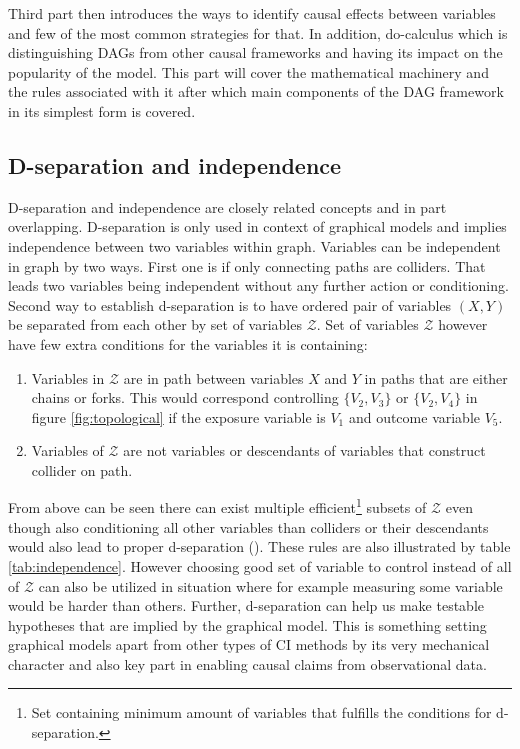 \documentclass[main=english,12pt,a4paper,pdftex,econ,utf8]{aaltothesis}
\newcommand{\z}{\mathcal{Z}}
\begin{document}
Third part then introduces the ways to identify causal effects between variables and few of the most common strategies for that. In addition, do-calculus which is distinguishing DAGs from other causal frameworks and having its impact on the popularity of the model. This part will cover the mathematical machinery and the rules associated with it after which main components of the DAG framework in its simplest form is covered.

\subsection{D-separation and independence} \label{subsection:d and indep}

D-separation and independence are closely related concepts and in part overlapping. D-separation is only used in context of graphical models and implies independence between two variables within graph. Variables can be independent in graph by two ways. First one is if only connecting paths are colliders. That leads two variables being independent without any further action or conditioning. Second way to establish d-separation is to have ordered pair of variables $(X, Y)$ be separated from each other by set of variables $\z$. Set of variables $\z$ however have few extra conditions for the variables it is containing:

\begin{enumerate}
    \item Variables in $\z$ are in path between variables $X$ and $Y$ in paths that are either chains or forks. This would correspond controlling $\{V_{2},V_{3}\}$ or $\{V_{2},V_{4}\}$ in figure \ref{fig:topological} if the exposure variable is $V_{1}$ and outcome variable $V_{5}$.
    \item Variables of $\z$ are not variables or descendants of variables that construct collider on path.
\end{enumerate}

From above can be seen there can exist multiple efficient\footnote{Set containing minimum amount of variables that fulfills the conditions for d-separation.} subsets of $\z$ even though also conditioning all other variables than colliders or their descendants would also lead to proper d-separation (\cite{Pearl2016}). These rules are also illustrated by table \ref{tab:independence}. However choosing good set of variable to control instead of all of $\z$ can also be utilized in situation where for example measuring some variable would be harder than others. Further, d-separation can help us make testable hypotheses that are implied by the graphical model. This is something setting graphical models apart from other types of CI methods by its very mechanical character and also key part in enabling causal claims from observational data.
\end{document}
